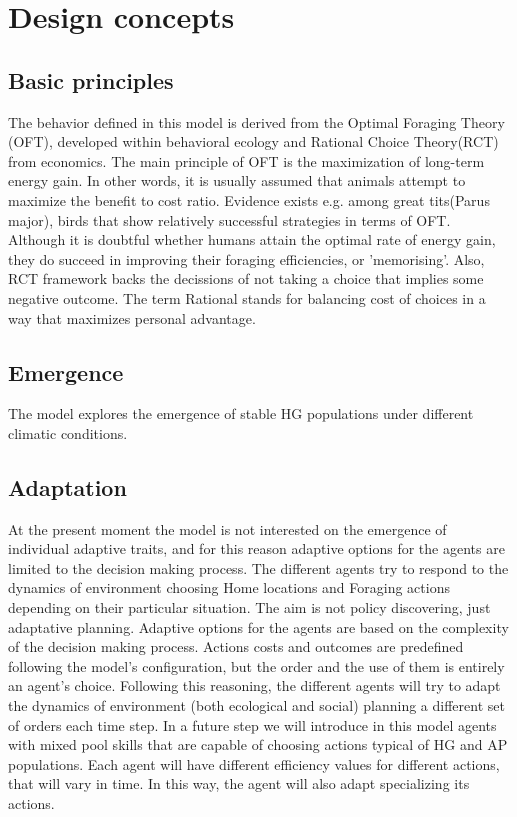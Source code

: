 \documentclass[11pt,oneside,a4paper,openright]{report}
\begin{document}
\section{Design concepts}

\subsection{Basic principles}
The behavior defined in this model is derived from the Optimal Foraging Theory (OFT)\cite{Holling1973}, developed
within behavioral ecology and Rational Choice Theory(RCT)\cite{Scott2000} from economics. The main principle of OFT is the maximization of long-term energy gain. In other words, it is usually assumed that animals attempt to maximize the benefit to cost ratio. Evidence exists e.g. among great tits(Parus major), birds that show relatively successful strategies in terms of OFT. Although it is doubtful whether humans attain the optimal rate of energy gain, they do succeed in improving their foraging efficiencies, or 'memorising'. Also, RCT framework backs the decissions of not taking a choice that implies some negative outcome. The term Rational stands for balancing cost of choices in a way that maximizes personal advantage.


\subsection{Emergence}
The model explores the emergence of stable HG populations under different climatic conditions.




\subsection{Adaptation}
\label{sec:Adaptation}
At the present moment the model is not interested on the emergence of individual adaptive traits, and
for this reason adaptive options for the agents are limited to the decision making process. The different
agents try to respond to the dynamics of environment choosing Home locations and Foraging actions
depending on their particular situation. The aim is not policy discovering, just adaptative planning.
Adaptive options for the agents are based on the complexity of the decision making process. Actions
costs and outcomes are predefined following the model's configuration, but the order and the use of
them is entirely an agent's choice. Following this reasoning, the different agents will try to adapt the
dynamics of environment (both ecological and social) planning a different set of orders each time step.
In a future step we will introduce in this model agents with mixed pool skills that are capable of choosing actions typical of HG and AP populations. Each agent will have different efficiency values for different actions, that will vary in time. In this way, the agent will also adapt specializing its actions.
\end{document}
